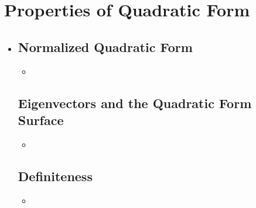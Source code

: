 \section{Properties of Quadratic Form}\label{Properties of Quadratic Form}
\begin{itemize}
  \item[]
  
  \subsection{Normalized Quadratic Form}\label{Normalized Quadratic Form}
  \begin{itemize}
    \item 
  \end{itemize}

  \subsection{Eigenvectors and the Quadratic Form Surface}\label{Eigenvectors and the Quadratic Form Surface}
  \begin{itemize}
    \item 
  \end{itemize}
  
  \subsection{Definiteness}\label{Definiteness}
  \begin{itemize}
    \item 
  \end{itemize}
  
  
  
\end{itemize}


